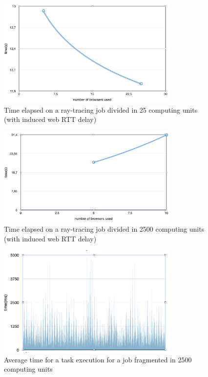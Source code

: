 \begin{figure}[h!]
  \centering
  \includegraphics[width=0.8\textwidth]{figs/4.png}
  \caption{Time elapsed on a ray-tracing job divided in 25 computing units (with induced web RTT delay)}
  \label{fig:ray25time}
\end{figure}


\begin{figure}[h!]
  \centering
  \includegraphics[width=0.8\textwidth]{figs/3.png}
  \caption{Time elapsed on a ray-tracing job divided in 2500 computing units (with induced web RTT delay)}
  \label{fig:ray2500time}
\end{figure}



\begin{figure}[h!]
  \centering
  \includegraphics[width=0.8\textwidth]{figs/avg_time_exec.png}
  \caption{Average time for a task execution for a job fragmented in 2500 computing units}
  \label{fig:avgtimeexec}
\end{figure}

